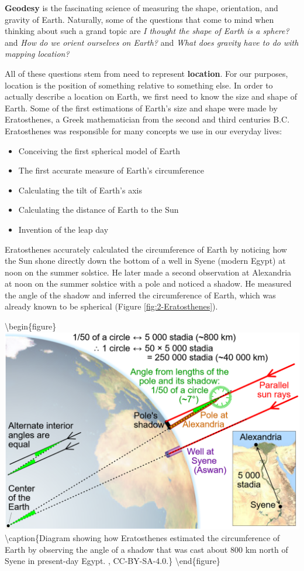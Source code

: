 \documentclass[
]{book}
\providecommand{\tightlist}{%
  \setlength{\itemsep}{0pt}\setlength{\parskip}{0pt}}
\begin{document}
\textbf{Geodesy} is the fascinating science of measuring the shape, orientation, and gravity of Earth. Naturally, some of the questions that come to mind when thinking about such a grand topic are \emph{I thought the shape of Earth is a sphere?} and \emph{How do we orient ourselves on Earth?} and \emph{What does gravity have to do with mapping location?}

All of these questions stem from need to represent \textbf{location}. For our purposes, location is the position of something relative to something else. In order to actually describe a location on Earth, we first need to know the size and shape of Earth. Some of the first estimations of Earth's size and shape were made by Eratosthenes, a Greek mathematician from the second and third centuries B.C. Eratosthenes was responsible for many concepts we use in our everyday lives:

\begin{itemize}
\tightlist
\item
  Conceiving the first spherical model of Earth
\item
  The first accurate measure of Earth's circumference
\item
  Calculating the tilt of Earth's axis
\item
  Calculating the distance of Earth to the Sun
\item
  Invention of the leap day
\end{itemize}

Eratosthenes accurately calculated the circumference of Earth by noticing how the Sun shone directly down the bottom of a well in Syene (modern Egypt) at noon on the summer solstice. He later made a second observation at Alexandria at noon on the summer solstice with a pole and noticed a shadow. He measured the angle of the shadow and inferred the circumference of Earth, which was already known to be spherical (Figure \ref{fig:2-Eratosthenes}).

\textbackslash begin\{figure\}
\includegraphics[width=0.75\linewidth]{images/02-Eratosthenes} \textbackslash caption\{Diagram showing how Eratosthenes estimated the circumference of Earth by observing the angle of a shadow that was cast about 800 km north of Syene in present-day Egypt. \citep{monniaux_illustration_2005}, CC-BY-SA-4.0.\}\label{fig:2-Eratosthenes}
\textbackslash end\{figure\}
\end{document}
